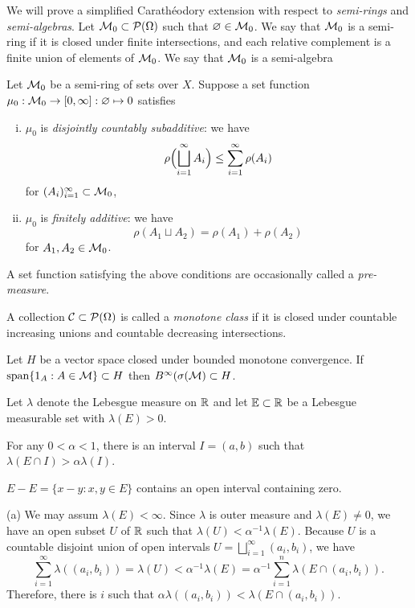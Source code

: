 \documentclass{../../large}
\begin{document}
\begin{prb}
We will prove a simplified Carath\'eodory extension with respect to \emph{semi-rings} and \emph{semi-algebras}.
Let $\mathcal{M}_0\subset\mathcal{P}(\Omega)$ such that $\varnothing\in\mathcal{M}_0$.
We say that $\mathcal{M}_0$ is a semi-ring if it is closed under finite intersections, and each relative complement is a finite union of elements of $\mathcal{M}_0$.
We say that $\mathcal{M}_0$ is a semi-algebra

Let $\mathcal{M}_0$ be a semi-ring of sets over $X$.
Suppose a set function $\mu_0:\mathcal{M}_0\to[0,\infty]:\varnothing\mapsto0$ satisfies
\begin{enumerate}[(i)]
\item $\mu_0$ is \emph{disjointly countably subadditive}: we have
\[\rho\Bigl(\bigsqcup_{i=1}^\infty A_i\Bigr)\le\sum_{i=1}^\infty\rho(A_i)\]
for $(A_i)_{i=1}^\infty\subset\mathcal{M}_0$,
\item $\mu_0$ is \emph{finitely additive}: we have
\[\rho(A_1\sqcup A_2)=\rho(A_1)+\rho(A_2)\]
for $A_1,A_2\in\mathcal{M}_0$.
\end{enumerate}
A set function satisfying the above conditions are occasionally called a \emph{pre-measure}.
\begin{parts}
\item
\item 
\end{parts}
\end{prb}

\begin{prb}
A collection $\mathcal{C}\subset\mathcal{P}(\Omega)$ is called a \emph{monotone class} if it is closed under countable increasing unions and countable decreasing intersections.

Let $H$ be a vector space closed under bounded monotone convergence.
If $\operatorname{span}\{1_A:A\in\mathcal{M}\}\subset H$ then $B^\infty(\sigma(\mathcal{M})\subset H$.
\end{prb}






\begin{prb}
Let $\lambda$ denote the Lebesgue measure on $\mathbb{R}$ and let $\mathbb{E}\subset\mathbb{R}$ be a Lebesgue measurable set with $\lambda(E)>0$.
\begin{parts}
\item For any $0<\alpha<1$, there is an interval $I=(a,b)$ such that $\lambda(E\cap I)>\alpha\lambda(I)$.
\item $E-E=\{x-y:x,y\in E\}$ contains an open interval containing zero.
\end{parts}
\begin{pf}
(a)
We may assum $\lambda(E)<\infty$.
Since $\lambda$ is outer measure and $\lambda(E)\ne0$, we have an open subset $U$ of $\mathbb{R}$ such that $\lambda(U)<\alpha^{-1}\lambda(E)$.
Because $U$ is a countable disjoint union of open intervals $U=\bigsqcup_{i=1}^\infty(a_i,b_i)$, we have
\[\sum_{i=1}^\infty\lambda((a_i,b_i))=\lambda(U)<\alpha^{-1}\lambda(E)=\alpha^{-1}\sum_{i=1}^n\lambda(E\cap(a_i,b_i)).\]
Therefore, there is $i$ such that $\alpha\lambda((a_i,b_i))<\lambda(E\cap(a_i,b_i))$.
\end{pf}
\end{prb}
\end{document}
